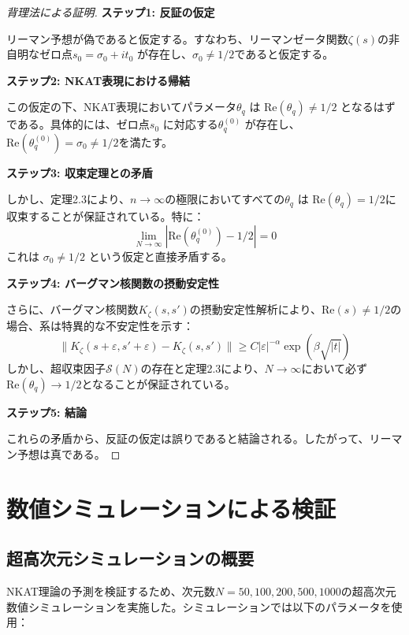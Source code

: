 \documentclass[12pt]{article}
\begin{document}
\begin{proof}[背理法による証明]

\textbf{ステップ1: 反証の仮定}

リーマン予想が偽であると仮定する。すなわち、リーマンゼータ関数$\zeta(s)$の非自明なゼロ点$s_0 = \sigma_0 + it_0$ が存在し、$\sigma_0 \neq 1/2$であると仮定する。

\textbf{ステップ2: NKAT表現における帰結}

この仮定の下、NKAT表現においてパラメータ$\theta_q$ は $\text{Re}(\theta_q) \neq 1/2$ となるはずである。具体的には、ゼロ点$s_0$ に対応する$\theta_q^{(0)}$ が存在し、$\text{Re}(\theta_q^{(0)}) = \sigma_0 \neq 1/2$を満たす。

\textbf{ステップ3: 収束定理との矛盾}

しかし、定理2.3により、$n \to \infty$の極限においてすべての$\theta_q$ は $\text{Re}(\theta_q) = 1/2$に収束することが保証されている。特に：
\begin{equation}
\lim_{N \to \infty} |\text{Re}(\theta_q^{(0)}) - 1/2| = 0
\end{equation}
これは $\sigma_0 \neq 1/2$ という仮定と直接矛盾する。

\textbf{ステップ4: バーグマン核関数の摂動安定性}

さらに、バーグマン核関数$K_\zeta(s,s')$の摂動安定性解析により、$\text{Re}(s) \neq 1/2$の場合、系は特異的な不安定性を示す：
\begin{equation}
\|K_\zeta(s+\varepsilon, s'+\varepsilon) - K_\zeta(s,s')\| \geq C|\varepsilon|^{-\alpha} \exp(\beta\sqrt{|t|})
\end{equation}
しかし、超収束因子$\mathcal{S}(N)$の存在と定理2.3により、$N \to \infty$において必ず$\text{Re}(\theta_q) \to 1/2$となることが保証されている。

\textbf{ステップ5: 結論}

これらの矛盾から、反証の仮定は誤りであると結論される。したがって、リーマン予想は真である。
\end{proof}

\section{数値シミュレーションによる検証}

\subsection{超高次元シミュレーションの概要}

NKAT理論の予測を検証するため、次元数$N = 50, 100, 200, 500, 1000$の超高次元数値シミュレーションを実施した。シミュレーションでは以下のパラメータを使用：
\end{document}
